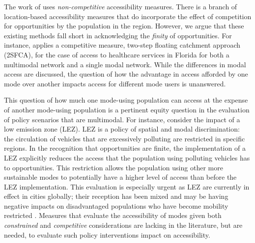 \documentclass[]{trbunofficial}
\begin{document}
The work of \citet{leeMeasuringImpactsNew2018} uses
\emph{non-competitive} accessibility measures. There is a branch of
location-based accessibility measures that do incorporate the effect of
competition for opportunities by the population in the region. However,
we argue that these existing methods fall short in acknowledging the
\emph{finity} of opportunities. For instance,
\citet{maoMeasuringSpatialAccessibility2013} applies a competitive
measure, two-step floating catchment approach (2SFCA), for the case of
access to healthcare services in Florida for both a multimodal network
and a single modal network. While the differences in modal access are
discussed, the question of how the advantage in access afforded by one
mode over another impacts access for different mode users is unanswered.

This question of how much one mode-using population can access at the
expense of another mode-using population is a pertinent equity question
in the evaluation of policy scenarios that are multimodal. For instance,
consider the impact of a low emission zone (LEZ). LEZ is a policy of
spatial and modal discrimination: the circulation of vehicles that are
excessively polluting are restricted in specific regions. In the
recognition that opportunities are finite, the implementation of a LEZ
explicitly reduces the access that the population using polluting
vehicles has to opportunities. This restriction allows the population
using other more sustainable modes to potentially have a higher level of
access than before the LEZ implementation. This evaluation is especially
urgent as LEZ are currently in effect in cities globally; their
reception has been mixed \citep{tarrinoortizPublicAcceptabilityLow2021}
and may be having negative impacts on disadvantaged populations who have
become mobility restricted
\citep{devrijNooneVisitsMe2022, verbeekJustManagementUrban2022}.
Measures that evaluate the accessibility of modes given both
\emph{constrained} and \emph{competitive} considerations are lacking in
the literature, but are needed, to evaluate such policy interventions
impact on accessibility.
\end{document}
